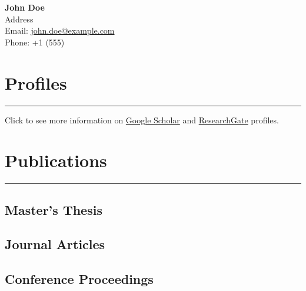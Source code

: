 \documentclass[a4paper,12pt]{article} %
\begin{document}
\noindent
\begin{minipage}[c]{0.6\textwidth}
    {\LARGE \bfseries John Doe}\\
    Address\\
    Email: \href{mailto:john.doe@example.com}{john.doe@example.com}\\
    Phone: +1 (555)
\end{minipage}

\section*{Profiles}
\hrule\medskip

Click to see more information on \href{https://scholar.google.com/citations?user=5hyZ0wsAAAAJhl\&user=5hyZ0wsAAAAJ}{Google Scholar} and  \href{https://www.researchgate.net/profile/Bekir-Bakar}{ResearchGate} profiles.

\section*{Publications}
\hrule\medskip

\subsection*{Master's Thesis}
\begin{refsection}
    \nocite{bakar2018mastertshesis}
    \printbibliography[type=thesis,heading=none]
\end{refsection}

\subsection*{Journal Articles}
\begin{refsection}
    \nocite{yayik2022deep}
    \printbibliography[type=article,heading=none]
\end{refsection}

\subsection*{Conference Proceedings}
\begin{refsection}
    \nocite{bakar2020turkish, bakar2018experimental, bakar2018replay}
    \printbibliography[type=inproceedings,heading=none]
\end{refsection}
\end{document}
